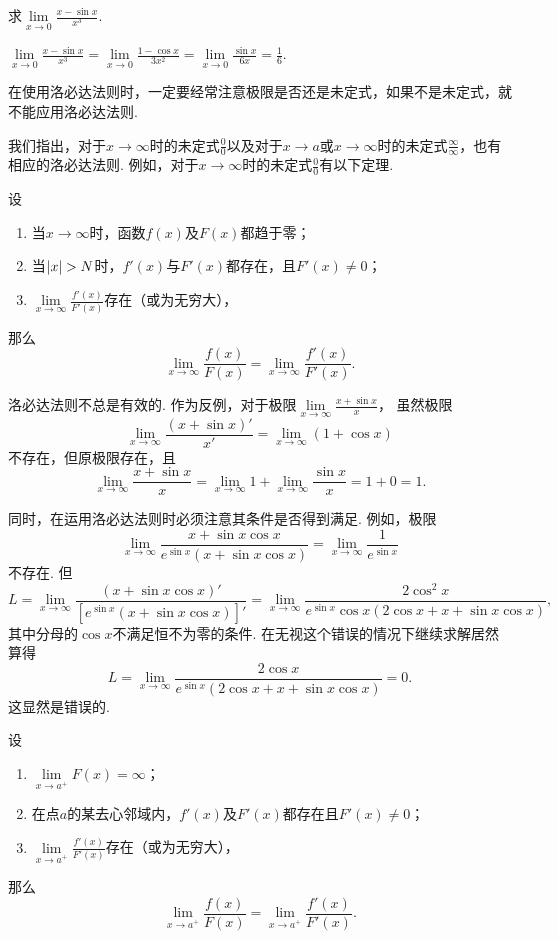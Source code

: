 \begin{example}
\def\l{\lim\limits_{x\to0}}
\def\a{\l\frac{x-\sin x}{x^3}}
求\(\a\).
\begin{solution}
\(\a = \l\frac{1-\cos x}{3x^2} = \l\frac{\sin x}{6x} = \frac{1}{6}\).
\end{solution}
\end{example}

在使用洛必达法则时，一定要经常注意极限是否还是未定式，如果不是未定式，就不能应用洛必达法则.

我们指出，对于\(x\to\infty\)时的未定式\(\frac{0}{0}\)以及对于\(x \to a\)或\(x\to\infty\)时的未定式\(\frac{\infty}{\infty}\)，也有相应的洛必达法则.
例如，对于\(x\to\infty\)时的未定式\(\frac{0}{0}\)有以下定理.
\begin{theorem}\label{theorem:微分中值定理.洛必达法则2}
\def\l{\lim\limits_{x\to\infty}}
设\begin{enumerate}
	\item 当\(x\to\infty\)时，函数\(f(x)\)及\(F(x)\)都趋于零；
	\item 当\(\abs{x}>N\)时，\(f'(x)\)与\(F'(x)\)都存在，且\(F'(x) \neq 0\)；
	\item \(\l\frac{f'(x)}{F'(x)}\)存在（或为无穷大），
\end{enumerate}那么\[
	\l\frac{f(x)}{F(x)} = \l\frac{f'(x)}{F'(x)}.
\]
\end{theorem}

\begin{example}
\def\l{\lim\limits_{x\to\infty}}%
\def\a{\l\frac{x+\sin x}{x}}%
洛必达法则不总是有效的.
作为反例，对于极限\(\a\)，
虽然极限\[
\l\frac{(x+\sin x)'}{x'} = \l(1+\cos x)
\]不存在，但原极限存在，且
\[
\a = \l1+\l\frac{\sin x}{x} = 1 + 0 = 1.
\]

\def\l{\lim\limits_{x\to\infty}}%
\def\a{\l\frac{x+\sin x \cos x}{e^{\sin x}(x+\sin x \cos x)}}%
同时，在运用洛必达法则时必须注意其条件是否得到满足.
例如，极限\[
\a = \l\frac{1}{e^{\sin x}}
\]不存在.
但\[
L = \l\frac{(x+\sin x \cos x)'}{[e^{\sin x}(x+\sin x \cos x)]'} = \l\frac{2\cos^2 x}{e^{\sin x}\cos x(2\cos x + x + \sin x \cos x)},
\]其中分母的\(\cos x\)不满足恒不为零的条件.
在无视这个错误的情况下继续求解居然算得
\[
L = \l\frac{2\cos x}{e^{\sin x}(2\cos x + x + \sin x \cos x)} = 0.
\]
这显然是错误的.
\end{example}

\begin{theorem}\label{theorem:微分中值定理.洛必达法则3}
\def\l{\lim\limits_{x \to a^+}}
设\begin{enumerate}
\item \(\l F(x) = \infty\)；
\item 在点\(a\)的某去心邻域内，\(f'(x)\)及\(F'(x)\)都存在且\(F'(x) \neq 0\)；
\item \(\l\frac{f'(x)}{F'(x)}\)存在（或为无穷大），
\end{enumerate}那么\[
\l\frac{f(x)}{F(x)} = \l\frac{f'(x)}{F'(x)}.
\]
\end{theorem}

